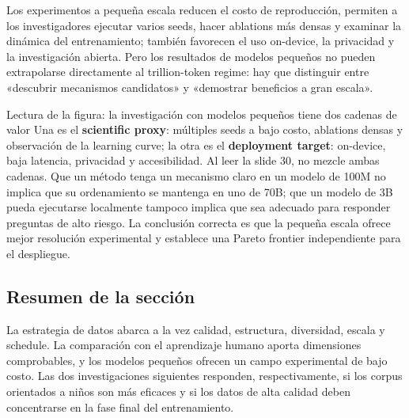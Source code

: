 Los experimentos a pequeña escala reducen el costo de reproducción, permiten a los investigadores ejecutar varios seeds, hacer ablations más densas y examinar la dinámica del entrenamiento; también favorecen el uso on-device, la privacidad y la investigación abierta. Pero los resultados de modelos pequeños no pueden extrapolarse directamente al trillion-token regime: hay que distinguir entre «descubrir mecanismos candidatos» y «demostrar beneficios a gran escala».



\begin{knowledgebox}{Lectura de la figura: la investigación con modelos pequeños tiene dos cadenas de valor}
Una es el \textbf{scientific proxy}: múltiples seeds a bajo costo, ablations densas y observación de la learning curve; la otra es el \textbf{deployment target}: on-device, baja latencia, privacidad y accesibilidad. Al leer la slide 30, no mezcle ambas cadenas. Que un método tenga un mecanismo claro en un modelo de 100M no implica que su ordenamiento se mantenga en uno de 70B; que un modelo de 3B pueda ejecutarse localmente tampoco implica que sea adecuado para responder preguntas de alto riesgo. La conclusión correcta es que la pequeña escala ofrece mejor resolución experimental y establece una Pareto frontier independiente para el despliegue.
\end{knowledgebox}


\subsection{Resumen de la sección}

La estrategia de datos abarca a la vez calidad, estructura, diversidad, escala y schedule. La comparación con el aprendizaje humano aporta dimensiones comprobables, y los modelos pequeños ofrecen un campo experimental de bajo costo. Las dos investigaciones siguientes responden, respectivamente, si los corpus orientados a niños son más eficaces y si los datos de alta calidad deben concentrarse en la fase final del entrenamiento.
